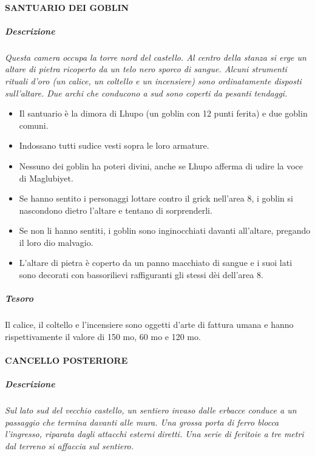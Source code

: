 \documentclass{article}
\begin{document}
\paragraph{SANTUARIO DEI GOBLIN}
    \subparagraph{Descrizione} \textit{Questa camera occupa la torre nord del castello. Al centro
    della stanza si erge un altare di pietra ricoperto da un telo nero
    sporco di sangue. Alcuni strumenti rituali d’oro (un calice,
    un coltello e un incensiere) sono ordinatamente disposti
    sull’altare. Due archi che conducono a sud sono coperti da
    pesanti tendaggi.}

    \begin{itemize}
        \item Il santuario è la dimora di Lhupo (un goblin con 12 punti ferita) e due goblin comuni.
        \item Indossano tutti sudice vesti sopra le loro armature.
        \item Nessuno dei goblin ha poteri divini, anche se Lhupo afferma di udire la voce di Maglubiyet.
        \item Se hanno sentito i personaggi lottare contro il grick nell'area 8, i goblin si nascondono dietro l'altare e tentano di sorprenderli.
        \item Se non li hanno sentiti, i goblin sono inginocchiati davanti all'altare, pregando il loro dio malvagio.
        \item L'altare di pietra è coperto da un panno macchiato di sangue e i suoi lati sono decorati con bassorilievi raffiguranti gli stessi dèi dell'area 8.
    \end{itemize}

    \subparagraph{Tesoro}Il calice, il coltello e l’incensiere sono oggetti d’arte di
    fattura umana e hanno rispettivamente il valore di 150 mo,
    60 mo e 120 mo.
    
\paragraph{CANCELLO POSTERIORE}

    \subparagraph{Descrizione}\textit{Sul lato sud del vecchio castello, un sentiero invaso dalle
    erbacce conduce a un passaggio che termina davanti alle
    mura. Una grossa porta di ferro blocca l’ingresso, riparata
    dagli attacchi esterni diretti. Una serie di feritoie a tre metri
    dal terreno si affaccia sul sentiero.}
\end{document}
